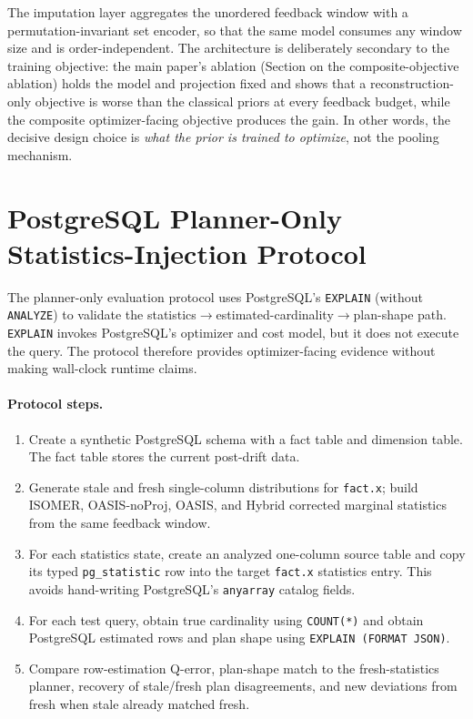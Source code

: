\documentclass[11pt]{article}
\begin{document}
The imputation layer aggregates the unordered feedback window with a
permutation-invariant set encoder, so that the same model consumes any window size and is
order-independent. The architecture is deliberately secondary to the training objective:
the main paper's ablation (Section on the composite-objective ablation) holds the model and
projection fixed and shows that a reconstruction-only objective is worse than the classical
priors at every feedback budget, while the composite optimizer-facing objective produces
the gain. In other words, the decisive design choice is \emph{what the prior is trained to
optimize}, not the pooling mechanism.

\section{PostgreSQL Planner-Only Statistics-Injection Protocol}
\label{sec:optimizer-protocol-app}

The planner-only evaluation protocol uses PostgreSQL's \texttt{EXPLAIN}
(without \texttt{ANALYZE}) to validate the
statistics$\rightarrow$estimated-cardinality$\rightarrow$plan-shape path.
\texttt{EXPLAIN} invokes PostgreSQL's optimizer and cost model, but it does not
execute the query. The protocol therefore provides optimizer-facing evidence
without making wall-clock runtime claims.

\paragraph{Protocol steps.}
\begin{enumerate}
  \item Create a synthetic PostgreSQL schema with a fact table and dimension
        table. The fact table stores the current post-drift data.
  \item Generate stale and fresh single-column distributions for
        \texttt{fact.x}; build ISOMER, OASIS-noProj, OASIS, and Hybrid corrected
        marginal statistics from the same feedback window.
  \item For each statistics state, create an analyzed one-column source table
        and copy its typed \texttt{pg\_statistic} row into the target
        \texttt{fact.x} statistics entry. This avoids hand-writing
        PostgreSQL's \texttt{anyarray} catalog fields.
  \item For each test query, obtain true cardinality using \texttt{COUNT(*)}
        and obtain PostgreSQL estimated rows and plan shape using
        \texttt{EXPLAIN (FORMAT JSON)}.
  \item Compare row-estimation Q-error, plan-shape match to the
        fresh-statistics planner, recovery of stale/fresh plan disagreements,
        and new deviations from fresh when stale already matched fresh.
\end{enumerate}
\end{document}
